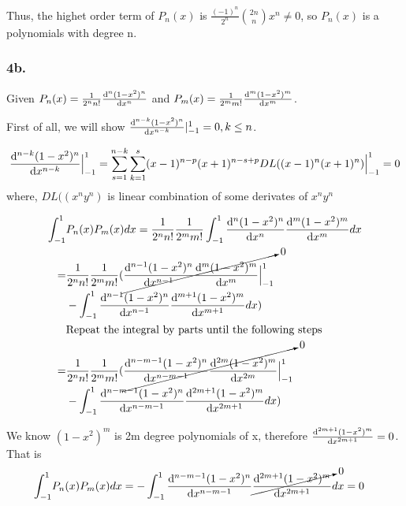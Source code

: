 \documentclass{article}
\begin{document}
Thus, the highet order term of $P_n(x)$ is $\frac{(-1)^n }{2^n} \binom{2n}{n} x^{n} \neq 0$, so  $P_n(x)$ is a polynomials with degree n.

\subsubsection*{ 4b.}

Given $ P_n(x) = \frac{1}{2^n n!}\dv[n]{(1-x^2)^n}{x}$ and $P_m(x) =  \frac{1}{2^m m!} \dv[m]{(1-x^2)^m}{x}$.

First of all, we will show $\dv[n-k]{(1-x^2)^n}{x} \vert^1_{-1} = 0, k \leq n$.

$$ \dv[n-k]{(1-x^2)^n}{x} \Big\vert^1_{-1} = \sum^{n-k}_{s=1} \sum^{s}_{k=1} (x-1)^{n-p} (x+1)^{n-s+p} DL((x-1)^n (x+1)^n) \Big\vert^1_{-1} = 0$$
where,  $DL((x^n y^n)$ is linear combination of some derivates of $x^n y^n$

\begin{equation}
  \begin{split}
    \int^{1}_{-1} & P_n(x) P_m(x) dx = \frac{1}{2^n n!} \frac{1}{2^m m!} \int^{1}_{-1}\dv[n]{(1-x^2)^n}{x} \dv[m]{(1-x^2)^m}{x} dx\\
    =& \frac{1}{2^n n!} \frac{1}{2^m m!} ( \cancelto{0}{\dv[n-1]{(1-x^2)^n}{x} \dv[m]{(1-x^2)^m}{x}\Big\vert^1_{-1}}\\
    &- \int^{1}_{-1}\dv[n-1]{(1-x^2)^n}{x} \dv[m+1]{(1-x^2)^m}{x} dx)\\
    &\text{Repeat the integral by parts until the following steps }\\
    =& \frac{1}{2^n n!} \frac{1}{2^m m!} ( \cancelto{0}{\dv[n-m-1]{(1-x^2)^n}{x} \dv[2m]{(1-x^2)^m}{x}\Big\vert^1_{-1}}\\
    &- \int^{1}_{-1}\dv[n-m-1]{(1-x^2)^n}{x} \dv[2m+1]{(1-x^2)^m}{x} dx)\\
  \end{split}
\end{equation}

We know $(1-x^2)^m$ is 2m degree polynomials of x, therefore  $\dv[2m+1]{(1-x^2)^m}{x} = 0$. That is
\begin{equation}
  \begin{split}
    \int^{1}_{-1} & P_n(x) P_m(x) dx = - \int^{1}_{-1}\dv[n-m-1]{(1-x^2)^n}{x} \cancelto{0}{\dv[2m+1]{(1-x^2)^m}{x}} dx = 0
  \end{split}
\end{equation}
\end{document}

